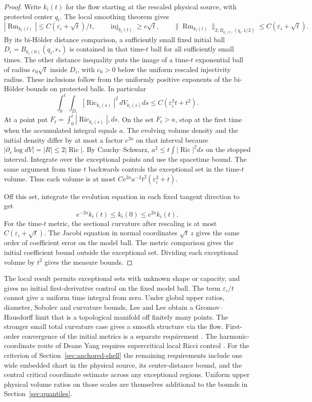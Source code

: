 \documentclass[11pt]{article}
\numberwithin{equation}{section}
\theoremstyle{definition}
\theoremstyle{remark}
\newcommand{\Ric}{\operatorname{Ric}}
\newcommand{\Rm}{\operatorname{Rm}}
\renewcommand{\epsilon}{\varepsilon}
\begin{document}
\begin{proof}
Write \(k_i(t)\) for the flow starting at the rescaled
physical source, with protected center \(q_i\). The
local smoothing theorem gives
\[
 |\Rm_{k_i(t)}|\le C(\epsilon_i+\sqrt t)/t,\qquad
 \operatorname{inj}_{k_i(t)}\ge c\sqrt t,\qquad
 \|\Rm_{k_i(t)}\|_{2;B_{k_i(t)}(q_i,1/2)}
       \le C(\epsilon_i+\sqrt t).
\]
By its bi-Hölder distance comparison,
a sufficiently small fixed initial ball
\(D_i=B_{k_i(0)}(q_i,r_*)\) is contained in that
time-\(t\) ball for all sufficiently small times.
The other distance inequality puts the image of a
time-\(t\) exponential ball of radius \(c_0\sqrt t\)
inside \(D_i\), with \(c_0>0\) below the uniform
rescaled injectivity radius. These inclusions follow from
the uniformly positive exponents of the bi-Hölder bounds
on protected balls. In particular
\[
 \int_0^t\int_{D_i}|\Ric_{k_i(s)}|^2\,dV_{k_i(s)}ds
       \le C(\epsilon_i^2 t+t^2).
\]
At a point put \(F_t=\int_0^t |\Ric_{k_i(s)}|,ds\). On
the set \(F_t>a\), stop at the first time when the
accumulated integral equals \(a\). The evolving volume
density and the initial density differ by at most a
factor \(e^{2a}\) on that interval because
\(|\partial_s\log dV|=|R|\le2|\Ric|\). By
Cauchy--Schwarz, \(a^2\le t\int|\Ric|^2ds\) on
the stopped interval. Integrate over the exceptional
points and use the spacetime bound. The same argument
from time \(t\) backwards controls the exceptional set
in the time-\(t\) volume. Thus each volume is at most
\(C e^{2a} a^{-2}t^2(\epsilon_i^2+t)\).

Off this set, integrate the evolution equation in
each fixed tangent direction to get
\[
 e^{-2a}k_i(t)\le k_i(0)\le e^{2a}k_i(t).
\]
For the time-\(t\) metric, the sectional curvature after
rescaling is at most \(C(\epsilon_i+\sqrt t)\).
The Jacobi equation in normal coordinates \(\sqrt t\,z\)
gives the same order of coefficient error on the model
ball. The metric comparison gives the initial coefficient
bound outside the exceptional set. Dividing each
exceptional volume by \(t^2\) gives the measure bounds.
\end{proof}

The local result permits exceptional sets with unknown
shape or capacity, and gives no initial first-derivative
control on the fixed model ball. The term
\(\epsilon_i/t\) cannot give a uniform time integral
from zero. Under global upper ratios, diameter, Sobolev
and curvature bounds, Lee and Lee obtain a
Gromov--Hausdorff limit that is a topological manifold
off finitely many points. The stronger small total
curvature case gives a smooth structure via the flow.
First-order convergence of the initial metrics is a
separate requirement
\cite[Theorem 1.3 and Remarks 4.5--4.6]{LeeLee2026Local}.
The harmonic-coordinate route of Deane Yang requires
supercritical local Ricci control
\cite[Theorems 3.1 and 7.1]{Yang1992ConvergenceII}.
For the criterion of Section~\ref{sec:anchored-shell} the
remaining requirements include one wide embedded chart in
the physical source, its center-distance bound, and the
central critical coordinate estimate across any exceptional
regions. Uniform upper physical volume ratios on those scales
are themselves additional to the bounds in
Section~\ref{sec:quantiles}.
\end{document}
